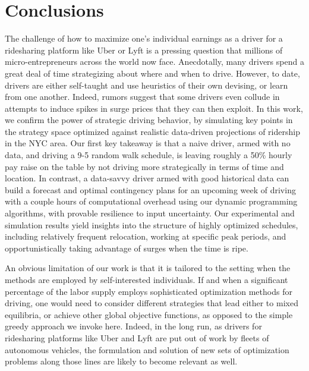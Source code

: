 
\section{Conclusions}
\label{sec:conclusions}

The challenge of how to maximize one's individual earnings as a driver for a 
ridesharing platform like Uber or Lyft is a pressing question that millions of micro-entrepreneurs 
across the world now face.  Anecdotally, many drivers spend a great deal of time 
strategizing about where and when to drive.  However, to date, drivers are either
self-taught and use heuristics of their own devising, or learn from one another.
Indeed, rumors suggest that some drivers even collude in attempts to induce spikes in surge 
prices that they can then exploit.
In this work, we confirm the power of strategic driving behavior, by simulating 
key points in the strategy space optimized against realistic data-driven projections
of ridership in the NYC area.  Our first key takeaway is that a naive driver,
armed with no data, and driving a 9-5 random walk schedule, is leaving 
roughly a 50\% hourly pay raise on the table by not driving more strategically 
in terms of time and location.  In contrast, a data-savvy driver armed with
good historical data can build a forecast and optimal contingency plans for 
an upcoming week of driving with a couple hours of computational overhead using 
our dynamic programming algorithms, with provable resilience to input
uncertainty.  Our experimental and simulation results yield insights into the
structure of highly optimized schedules, including relatively frequent relocation,
working at specific peak periods, and opportunistically taking advantage of 
surges when the time is ripe.  

An obvious limitation of our work is that it is tailored to the setting when the 
methods are employed by self-interested individuals.  If and when a 
significant percentage of the labor supply employs sophisticated optimization methods
for driving, one would need to consider different strategies that lead either to mixed 
equilibria, or achieve other global objective functions, as opposed to the simple 
greedy approach we invoke here.  Indeed, in the long run, as drivers for ridesharing 
platforms like Uber and Lyft are put out of work by fleets of autonomous vehicles, 
the formulation and solution of new sets of optimization problems along those lines
are likely to become relevant as well.



